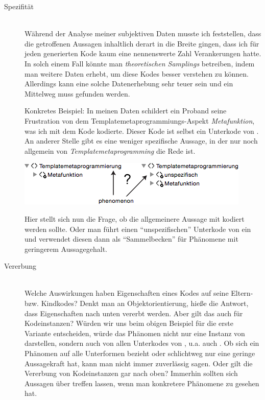 \begin{description}
  \item[Spezifität] \hfill \\
  Während der Analyse meiner subjektiven Daten musste ich feststellen, dass die getroffenen Aussagen inhaltlich derart in die Breite gingen, dass ich für jeden generierten Kode kaum eine nennenswerte Zahl Verankerungen hatte. In solch einem Fall könnte man \textit{theoretischen Samplings} betreiben, indem man weitere Daten erhebt, um diese Kodes besser verstehen zu können. Allerdings kann eine solche Datenerhebung sehr teuer sein und ein Mittelweg muss gefunden werden.
  
  Konkretes Beispiel: In meinen Daten schildert ein Proband seine Frustration von dem Templatemetaprogrammiungs-Aspekt \textit{Metafunktion}, was ich mit dem Kode  kodierte. Dieser Kode ist selbst ein Unterkode von . An anderer Stelle gibt es eine weniger spezifische Aussage, in der nur noch allgemein von \textit{Templatemetaprogramming} die Rede ist.
  
  \medskip
  
  \begin{center}
    \includegraphics[width=0.7\linewidth]{Figures/apiua/problem-specificity.png}
  \end{center}
  
  Hier stellt sich nun die Frage, ob die allgemeinere Aussage mit  kodiert werden sollte. Oder man führt einen ``unspezifischen'' Unterkode von  ein und verwendet diesen dann als ``Sammelbecken'' für Phänomene mit geringerem Aussagegehalt.
  
  
  
  \item[Vererbung] \hfill \\
  Welche Auswirkungen haben Eigenschaften eines Kodes auf seine Eltern- bzw. Kindkodes? Denkt man an Objektorientierung, hieße die Antwort, dass Eigenschaften nach unten vererbt werden. Aber gilt das auch für Kodeinstanzen? Würden wir uns beim obigen Beispiel für die erste Variante entscheiden, würde das Phänomen nicht nur eine Instanz von  darstellen, sondern auch von allen Unterkodes von , u.a. auch . Ob sich ein Phänomen auf alle Unterformen bezieht oder schlichtweg nur eine geringe Aussagekraft hat, kann man nicht immer zuverlässig sagen. Oder gilt die Vererbung von Kodeinstanzen gar nach oben? Immerhin sollten sich Aussagen über  treffen lassen, wenn man konkretere Phänomene zu  gesehen hat. 
  

\end{description}
